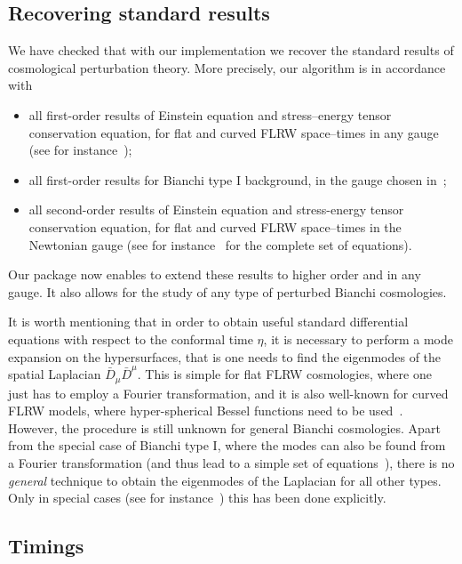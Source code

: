 \documentclass[notitlepage,onecolumn,floatfix,preprintnumbers,aps,prd,showpacs,nofootinbib,amsmath,amssymb,amsfonts]{revtex4-1}
\newcommand{\<}{\langle}
\renewcommand{\>}{\rangle}
\begin{document}
\subsection{Recovering standard results}

We have checked that with our implementation we recover the standard results of cosmological perturbation theory. 
More precisely, our algorithm is in accordance with 
\begin{itemize}
	\item all first-order results of Einstein equation and stress--energy tensor conservation equation, 
		for flat and curved FLRW space--times in any gauge (see for instance~\cite{Malik:2008im}); 
	\item all first-order results for Bianchi type I background, in the gauge chosen in~\cite{Pereira:2007yy,Dulaney:2010sq}; 
	\item all second-order results of Einstein equation and stress-energy tensor conservation equation, 
		for flat and curved FLRW space--times in the Newtonian gauge (see for instance~\cite{Nakamura2007} for the complete set of equations). 
\end{itemize}
%
Our package now enables to extend these results to higher order and in any gauge. 
It also allows for the study of any type of perturbed Bianchi cosmologies. 

It is worth mentioning that in order to obtain useful standard
differential equations with respect to the conformal time $\eta$, it is necessary to perform a mode expansion on the hypersurfaces, that is one needs to find the eigenmodes of the spatial Laplacian $\bar D_\mu \bar D^\mu$. 
This is simple for flat FLRW cosmologies, where one just has to employ a Fourier transformation, and it is also well-known for 
curved FLRW models, where hyper-spherical Bessel functions need to be used~\cite{Abbott:1986ct}. However, the procedure 
is still unknown for general Bianchi cosmologies. Apart from the special case of Bianchi type I, where the modes can also be found 
from a Fourier transformation (and thus lead to a simple set of equations~\cite{Pitrou:2008gk}), there is no \textit{general} technique 
to obtain the eigenmodes of the Laplacian for all other types. Only in special cases (see for instance~\cite{Pereira:2012ma}) this has been done explicitly. 

\subsection{Timings}
\end{document}
